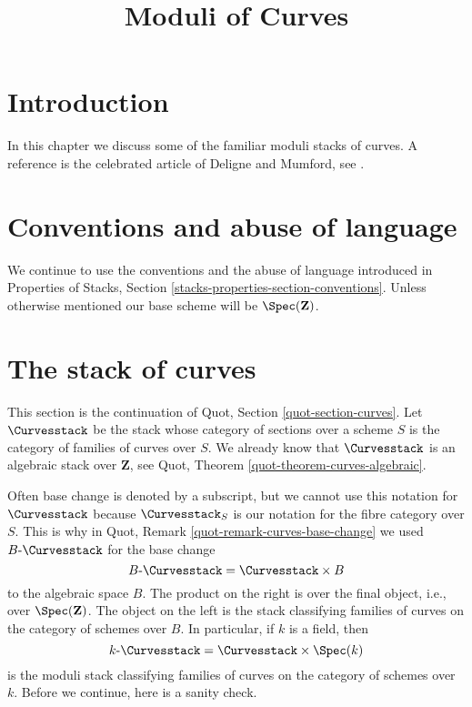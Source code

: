 

%


\title{Moduli of Curves}

\maketitle

\label{section-phantom}

\tableofcontents




\section{Introduction}
\label{section-introduction}

\noindent
In this chapter we discuss some of the familiar moduli stacks of curves.
A reference is the celebrated article of Deligne and Mumford, see \cite{DM}.




\section{Conventions and abuse of language}
\label{section-conventions}

\noindent
We continue to use the conventions and the abuse of language
introduced in
Properties of Stacks, Section \ref{stacks-properties-section-conventions}.
Unless otherwise mentioned our base scheme will be $\Spec(\mathbf{Z})$.







\section{The stack of curves}
\label{section-stack-curves}

\noindent
This section is the continuation of Quot, Section \ref{quot-section-curves}.
Let $\Curvesstack$ be the stack whose category of sections over a
scheme $S$ is the category of families of curves over $S$.
We already know that $\Curvesstack$ is an
algebraic stack over $\mathbf{Z}$, see Quot, Theorem
\ref{quot-theorem-curves-algebraic}.

\medskip\noindent
Often base change is denoted by a subscript, but we cannot use
this notation for $\Curvesstack$ because $\Curvesstack_S$
is our notation for the fibre category over $S$.
This is why in Quot, Remark \ref{quot-remark-curves-base-change}
we used $B\text{-}\Curvesstack$ for the base change
$$
B\text{-}\Curvesstack = \Curvesstack \times B
$$
to the algebraic space $B$. The product on the right is over the
final object, i.e., over $\Spec(\mathbf{Z})$. The object on the left
is the stack classifying families of curves on the category of schemes
over $B$. In particular, if $k$ is a field, then
$$
k\text{-}\Curvesstack = \Curvesstack \times \Spec(k)
$$
is the moduli stack classifying families of curves on the category
of schemes over $k$.
Before we continue, here is a sanity check.

